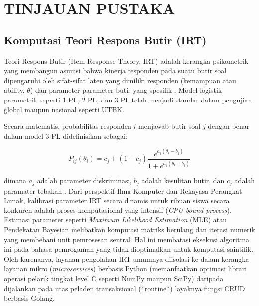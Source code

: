 \chapter{TINJAUAN PUSTAKA}


\section{Komputasi Teori Respons Butir (IRT)}

Teori Respons Butir (Item Response Theory, IRT) adalah kerangka psikometrik yang membangun asumsi bahwa kinerja responden
pada suatu butir soal dipengaruhi oleh sifat-sifat laten yang dimiliki responden (kemampuan atau ability, $\theta$) 
dan parameter-parameter butir yang spesifik \citep{Hambleton1985, Baker2004}. Model logistik parametrik seperti 
1-PL, 2-PL, dan 3-PL telah menjadi standar dalam pengujian global maupun nasional seperti UTBK.

Secara matematis, probabilitas responden $i$ menjawab butir soal $j$ dengan benar dalam model 3-PL didefinisikan sebagai:

\begin{equation}
	P_{ij}(\theta_i) = c_j + (1 - c_j) \frac{e^{a_j(\theta_i - b_j)}}{1 + e^{a_j(\theta_i - b_j)}}
\end{equation}

dimana $a_j$ adalah parameter diskriminasi, $b_j$ adalah kesulitan butir, dan $c_j$ adalah paramater tebakan 
\citep{Birnbaum1968}. Dari perspektif Ilmu Komputer dan Rekayasa Perangkat Lunak, kalibrasi parameter IRT secara dinamis 
untuk ribuan siswa secara konkuren adalah proses komputasional yang intensif (\textit{CPU-bound process}). 
Estimasi parameter seperti \textit{Maximum Likelihood Estimation} (MLE) atau Pendekatan Bayesian melibatkan komputasi 
matriks berulang dan iterasi numerik yang membebani unit pemrosesan sentral. Hal ini membatasi eksekusi algoritma ini 
pada bahasa pemrogaman yang tidak dioptimalkan untuk komputasi saintifik. Oleh karenanya, layanan pengolahan IRT umumnya 
diisolasi ke dalam kerangka layanan mikro (\textit{microservices}) berbasis Python (memanfaatkan optimasi 
librari operasi pelarik tingkat level C seperti NumPy maupun SciPy) daripada dijalankan pada utas peladen 
transaksional (*routine*) layaknya fungsi CRUD berbasis Golang.

